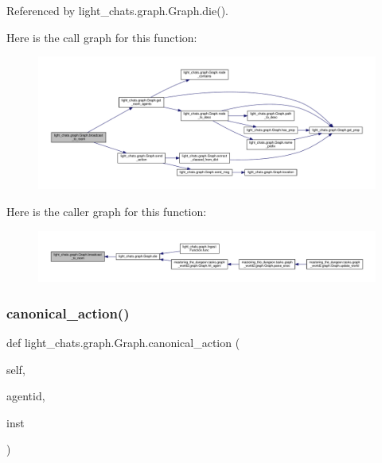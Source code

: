 Referenced by light\+\_\+chats.\+graph.\+Graph.\+die().

Here is the call graph for this function\+:
\nopagebreak
\begin{figure}[H]
\begin{center}
\leavevmode
\includegraphics[width=350pt]{classlight__chats_1_1graph_1_1Graph_ae53a707683cac4ddbafbefb0e0130bfa_cgraph}
\end{center}
\end{figure}
Here is the caller graph for this function\+:
\nopagebreak
\begin{figure}[H]
\begin{center}
\leavevmode
\includegraphics[width=350pt]{classlight__chats_1_1graph_1_1Graph_ae53a707683cac4ddbafbefb0e0130bfa_icgraph}
\end{center}
\end{figure}
\mbox{\label{classlight__chats_1_1graph_1_1Graph_af644853db532d4cfa276a884f04c8544}} 
\subsubsection{\texorpdfstring{canonical\+\_\+action()}{canonical\_action()}}
{\footnotesize\ttfamily def light\+\_\+chats.\+graph.\+Graph.\+canonical\+\_\+action (\begin{DoxyParamCaption}\item[{}]{self,  }\item[{}]{agentid,  }\item[{}]{inst }\end{DoxyParamCaption})}



